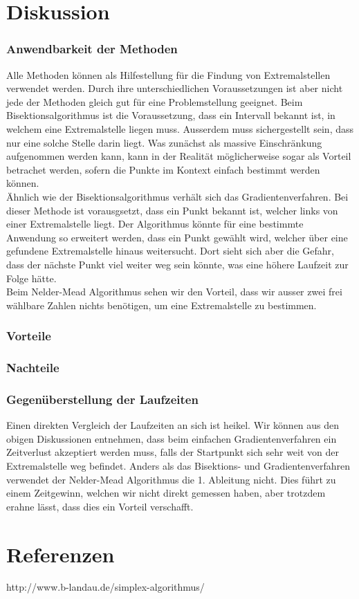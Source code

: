 \documentclass[10pt]{article}         %
\begin{document}
\section{Diskussion}
\subsubsection{Anwendbarkeit der Methoden}
Alle Methoden können als Hilfestellung für die Findung von Extremalstellen verwendet werden. Durch ihre unterschiedlichen Voraussetzungen ist aber nicht jede der Methoden gleich gut für eine Problemstellung geeignet. Beim Bisektionsalgorithmus ist die Voraussetzung, dass ein Intervall bekannt ist, in welchem eine Extremalstelle liegen muss. Ausserdem muss sichergestellt sein, dass nur eine solche Stelle darin liegt. Was zunächst als massive Einschränkung aufgenommen werden kann, kann in der Realität möglicherweise sogar als Vorteil betrachet werden, sofern die Punkte im Kontext einfach bestimmt werden können.\\
Ähnlich wie der Bisektionsalgorithmus verhält sich das Gradientenverfahren. Bei dieser Methode ist vorausgsetzt, dass ein Punkt bekannt ist, welcher links von einer Extremalstelle liegt. Der Algorithmus könnte für eine bestimmte Anwendung so erweitert werden, dass ein Punkt gewählt wird, welcher über eine gefundene Extremalstelle hinaus weitersucht. Dort sieht sich aber die Gefahr, dass der nächste Punkt viel weiter weg sein könnte, was eine höhere Laufzeit zur Folge hätte.\\
Beim Nelder-Mead Algorithmus sehen wir den Vorteil, dass wir ausser zwei frei wählbare Zahlen nichts benötigen, um eine Extremalstelle zu bestimmen.
\subsubsection{Vorteile}
\subsubsection{Nachteile}
\subsubsection{Gegenüberstellung der Laufzeiten}
Einen direkten Vergleich der Laufzeiten an sich ist heikel. Wir können aus den obigen Diskussionen entnehmen, dass beim einfachen Gradientenverfahren ein Zeitverlust akzeptiert werden muss, falls der Startpunkt sich sehr weit von der Extremalstelle weg befindet. Anders als das Bisektions- und Gradientenverfahren verwendet der Nelder-Mead Algorithmus die 1. Ableitung nicht. Dies führt zu einem Zeitgewinn, welchen wir nicht direkt gemessen haben, aber trotzdem erahne lässt, dass dies ein Vorteil verschafft.

\section{Referenzen}
\begin{list}{}{}
\item http://www.b-landau.de/simplex-algorithmus/
\end{list}
\end{document}
